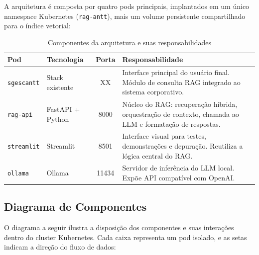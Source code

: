 \documentclass[12pt, a4paper]{article}
\begin{document}
A arquitetura é composta por quatro pods principais, implantados em um único namespace Kubernetes (\texttt{rag-antt}), mais um volume persistente compartilhado para o índice vetorial:

\begin{table}[H]
\centering
\small
\caption{Componentes da arquitetura e suas responsabilidades}
\label{tab:componentes}
\begin{tabularx}{\textwidth}{l l c X}
\toprule
\textbf{Pod} & \textbf{Tecnologia} & \textbf{Porta} & \textbf{Responsabilidade} \\
\midrule
\texttt{sgescantt} & Stack existente & XX & Interface principal do usuário final. Módulo de consulta RAG integrado ao sistema corporativo. \\
\texttt{rag-api} & FastAPI + Python & 8000 & Núcleo do RAG: recuperação híbrida, orquestração de contexto, chamada ao LLM e formatação de respostas. \\
\texttt{streamlit} & Streamlit & 8501 & Interface visual para testes, demonstrações e depuração. Reutiliza a lógica central do RAG. \\
\texttt{ollama} & Ollama & 11434 & Servidor de inferência do LLM local. Expõe API compatível com OpenAI. \\
\bottomrule
\end{tabularx}
\end{table}

\subsection{Diagrama de Componentes}

O diagrama a seguir ilustra a disposição dos componentes e suas interações dentro do cluster Kubernetes. Cada caixa representa um pod isolado, e as setas indicam a direção do fluxo de dados:
\end{document}
